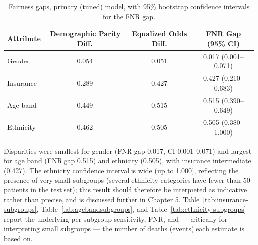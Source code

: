 \documentclass[12pt,a4paper]{report}
\begin{document}
\begin{table}[H]
\centering
\caption[Fairness gaps, primary (tuned) model, with 95\% bootstrap confidence intervals for the FNR gap.]{Fairness gaps, primary (tuned) model, with 95\% bootstrap confidence intervals for the FNR gap.\footnotemark}
\label{tab:fairness-summary}
\small
\begin{tabular}{lccc}
\toprule
Attribute & Demographic Parity Diff. & Equalized Odds Diff. & FNR Gap (95\% CI) \\
\midrule
Gender & 0.054 & 0.051 & 0.017 (0.001--0.071) \\
Insurance & 0.289 & 0.427 & 0.427 (0.210--0.683) \\
Age band & 0.449 & 0.515 & 0.515 (0.390--0.649) \\
Ethnicity & 0.462 & 0.505 & 0.505 (0.380--1.000) \\
\bottomrule
\end{tabular}
\end{table}


Disparities were smallest for gender (FNR gap 0.017, CI 0.001--0.071) and largest for age band (FNR gap 0.515) and ethnicity (0.505), with insurance intermediate (0.427). The ethnicity confidence interval is wide (up to 1.000), reflecting the presence of very small subgroups (several ethnicity categories have fewer than 50 patients in the test set); this result should therefore be interpreted as indicative rather than precise, and is discussed further in Chapter 5. Table~\ref{tab:insurance-subgroups}, Table~\ref{tab:agebandsubgroups}, and Table~\ref{tab:ethnicity-subgroups} report the underlying per-subgroup sensitivity, FNR, and --- critically for interpreting small subgroups --- the number of deaths (events) each estimate is based on.
\end{document}

